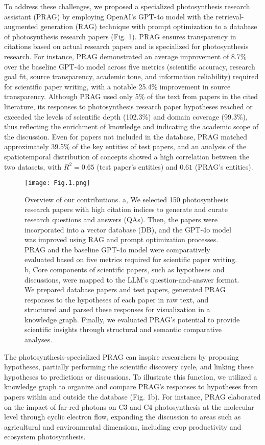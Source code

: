 \documentclass[12pt]{article}
\begin{document}
To address these challenges, we proposed a specialized photosynthesis research assistant (PRAG) by employing OpenAI's GPT-4o model with the retrieval-augmented generation (RAG) technique with prompt optimization to a database of photosynthesis research papers (Fig. 1). PRAG ensures transparency in citations based on actual research papers and is specialized for photosynthesis research. For instance, PRAG demonstrated an average improvement of 8.7\% over the baseline GPT-4o model across five metrics (scientific accuracy, research goal fit, source transparency, academic tone, and information reliability) required for scientific paper writing, with a notable 25.4\% improvement in source transparency. Although PRAG used only 5\% of the text from papers in the cited literature, its responses to photosynthesis research paper hypotheses reached or exceeded the levels of scientific depth (102.3\%) and domain coverage (99.3\%), thus reflecting the enrichment of knowledge and indicating the academic scope of the discussion. Even for papers not included in the database, PRAG matched approximately 39.5\% of the key entities of test papers, and an analysis of the spatiotemporal distribution of concepts showed a high correlation between the two datasets, with $R^2 = 0.65$ (test paper’s entities) and $0.61$ (PRAG’s entities).
\begin{figure}[h!]
    \centering
    \texttt{[image: Fig.1.png]}
    \caption{Overview of our contributions. a, We selected 150 photosynthesis research papers with high citation indices to generate and curate research questions and answers (QAs). Then, the papers were incorporated into a vector database (DB), and the GPT-4o model was improved using RAG and prompt optimization processes. PRAG and the baseline GPT-4o model were comparatively evaluated based on five metrics required for scientific paper writing. b, Core components of scientific papers, such as hypotheses and discussions, were mapped to the LLM's question-and-answer format. We prepared database papers and test papers, generated PRAG responses to the hypotheses of each paper in raw text, and structured and parsed these responses for visualization in a knowledge graph. Finally, we evaluated PRAG's potential to provide scientific insights through structural and semantic comparative analyses.}
    \label{fig:prag}
\end{figure}

The photosynthesis-specialized PRAG can inspire researchers by proposing hypotheses, partially performing the scientific discovery cycle, and linking these hypotheses to predictions or discussions. To illustrate this function, we utilized a knowledge graph to organize and compare PRAG's responses to hypotheses from papers within and outside the database (Fig. 1b). For instance, PRAG elaborated on the impact of far-red photons on C3 and C4 photosynthesis at the molecular level through cyclic electron flow, expanding the discussion to areas such as agricultural and environmental dimensions, including crop productivity and ecosystem photosynthesis.
\end{document}
